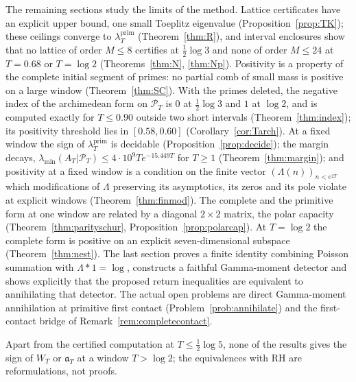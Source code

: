 \documentclass[11pt]{amsart}
\theoremstyle{definition}
\theoremstyle{remark}
\newcommand{\PT}{\mathcal P_T}
\newcommand{\lamP}{\lambda^{\mathrm{prim}}_T}
\newcommand{\lamA}{\lambda_{\min}(A_T|\PT)}
\begin{document}
The remaining sections study the limits of the method. Lattice certificates have an explicit upper
bound, one small Toeplitz eigenvalue (Proposition~\ref{prop:TK}); these ceilings converge to $\lamP$
(Theorem~\ref{thm:R}), and interval enclosures show that no lattice of order $M\le8$ certifies at
$\frac12\log3$ and none of order $M\le24$ at $T=0.68$ or $T=\log2$ (Theorems~\ref{thm:N}, \ref{thm:Np}).
Positivity is a property of the complete initial segment of primes: no partial comb of small mass is
positive on a large window (Theorem~\ref{thm:SC}). With the primes deleted, the negative index of the
archimedean form on $\PT$ is $0$ at $\frac12\log3$ and $1$ at $\log2$, and is computed exactly for
$T\le0.90$ outside two short intervals (Theorem~\ref{thm:index}); its positivity threshold lies in
$[0.58,0.60]$ (Corollary~\ref{cor:Tarch}). At a fixed window the sign of $\lamP$ is decidable
(Proposition~\ref{prop:decide}); the margin decays, $\lamA\le4\cdot10^9Te^{-15.449T}$ for $T\ge1$
(Theorem~\ref{thm:margin}); and positivity at a fixed window is a condition on the finite vector
$(\Lambda(n))_{n<e^{2T}}$ which modifications of $\Lambda$ preserving its asymptotics, its zeros and its
pole violate at explicit windows (Theorem~\ref{thm:finmod}). The complete and the primitive form at one
window are related by a diagonal $2\times2$ matrix, the polar capacity (Theorem~\ref{thm:parityschur},
Proposition~\ref{prop:polarcap}). At $T=\log2$ the complete form is positive on an explicit
seven-dimensional subspace (Theorem~\ref{thm:nest}). The last section proves a finite identity
combining Poisson summation with $\Lambda*1=\log$, constructs a faithful Gamma-moment detector and
shows explicitly that the proposed return inequalities are equivalent to annihilating that detector.
The actual open problems are direct Gamma-moment annihilation at primitive first contact
(Problem~\ref{prob:annihilate}) and the first-contact bridge of Remark~\ref{rem:completecontact}.

Apart from the certified computation at $T\le\frac12\log5$, none of the results gives the sign of $W_T$ or
$\mathfrak a_T$ at a window $T>\log2$; the equivalences with RH are reformulations, not proofs.
\end{document}
